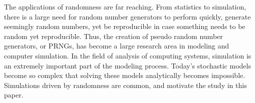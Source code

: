 The applications of randomness are far reaching. From statistics to simulation, there is a large need for random number generators to perform quickly, generate seemingly random numbers, yet be reproducible in case something needs to be random yet reproducible. Thus, the creation of pseudo random number generators, or PRNGs, has become a large research area in modeling and computer simulation. In the field of analysis of computing systems, simulation is an extremely important part of the modeling process. Today's stochastic models become so complex that solving these models analytically becomes impossible. Simulations driven by randomness are common, and motivate the study in this paper.
